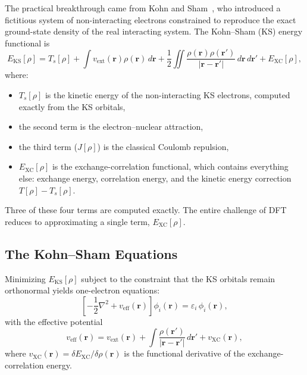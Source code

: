 \documentclass[11pt]{article}
\numberwithin{equation}{section}
\begin{document}
The practical breakthrough came from Kohn and Sham~\cite{KohnSham1965}, who introduced a fictitious system of non-interacting electrons constrained to reproduce the exact ground-state density of the real interacting system. The Kohn--Sham (KS) energy functional is
\begin{equation}
E_\text{KS}[\rho] = T_s[\rho] + \int v_\text{ext}(\mathbf{r})\rho(\mathbf{r})\,d\mathbf{r} + \frac{1}{2}\iint\frac{\rho(\mathbf{r})\rho(\mathbf{r}')}{|\mathbf{r}-\mathbf{r}'|}\,d\mathbf{r}\,d\mathbf{r}' + E_\text{XC}[\rho],
\label{eq:EKS}
\end{equation}
where:
\begin{itemize}
\item $T_s[\rho]$ is the kinetic energy of the non-interacting KS electrons, computed exactly from the KS orbitals,
\item the second term is the electron--nuclear attraction,
\item the third term ($J[\rho]$) is the classical Coulomb repulsion,
\item $E_\text{XC}[\rho]$ is the exchange-correlation functional, which contains everything else: exchange energy, correlation energy, and the kinetic energy correction $T[\rho] - T_s[\rho]$.
\end{itemize}

Three of these four terms are computed exactly. The entire challenge of DFT reduces to approximating a single term, $E_\text{XC}[\rho]$.

\subsection{The Kohn--Sham Equations}

Minimizing $E_\text{KS}[\rho]$ subject to the constraint that the KS orbitals remain orthonormal yields one-electron equations:
\begin{equation}
\left[-\frac{1}{2}\nabla^2 + v_\text{eff}(\mathbf{r})\right]\phi_i(\mathbf{r}) = \varepsilon_i\,\phi_i(\mathbf{r}),
\label{eq:KS_equations}
\end{equation}
with the effective potential
\begin{equation}
v_\text{eff}(\mathbf{r}) = v_\text{ext}(\mathbf{r}) + \int\frac{\rho(\mathbf{r}')}{|\mathbf{r}-\mathbf{r}'|}\,d\mathbf{r}' + v_\text{XC}(\mathbf{r}),
\end{equation}
where $v_\text{XC}(\mathbf{r}) = \delta E_\text{XC}/\delta\rho(\mathbf{r})$ is the functional derivative of the exchange-correlation energy.
\end{document}
